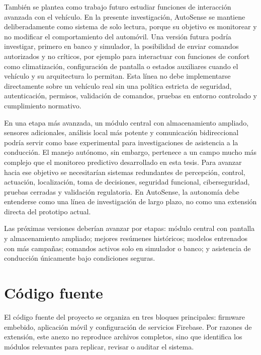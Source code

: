 \documentclass[12pt,letterpaper]{report}
\begin{document}
También se plantea como trabajo futuro estudiar funciones de interacción avanzada con el vehículo. En la presente investigación, AutoSense se mantiene deliberadamente como sistema de solo lectura, porque su objetivo es monitorear y no modificar el comportamiento del automóvil. Una versión futura podría investigar, primero en banco y simulador, la posibilidad de enviar comandos autorizados y no críticos, por ejemplo para interactuar con funciones de confort como climatización, configuración de pantalla o estados auxiliares cuando el vehículo y su arquitectura lo permitan. Esta línea no debe implementarse directamente sobre un vehículo real sin una política estricta de seguridad, autenticación, permisos, validación de comandos, pruebas en entorno controlado y cumplimiento normativo.

En una etapa más avanzada, un módulo central con almacenamiento ampliado, sensores adicionales, análisis local más potente y comunicación bidireccional podría servir como base experimental para investigaciones de asistencia a la conducción. El manejo autónomo, sin embargo, pertenece a un campo mucho más complejo que el monitoreo predictivo desarrollado en esta tesis. Para avanzar hacia ese objetivo se necesitarían sistemas redundantes de percepción, control, actuación, localización, toma de decisiones, seguridad funcional, ciberseguridad, pruebas cerradas y validación regulatoria. En AutoSense, la autonomía debe entenderse como una línea de investigación de largo plazo, no como una extensión directa del prototipo actual.

Las próximas versiones deberían avanzar por etapas: módulo central con pantalla y almacenamiento ampliado; mejores resúmenes históricos; modelos entrenados con más campañas; comandos activos solo en simulador o banco; y asistencia de conducción únicamente bajo condiciones seguras.

\begingroup
\sloppy
\printbibliography[heading=bibintoc,title={Referencias bibliográficas}]
\endgroup

\appendix

\chapter{Código fuente}

El código fuente del proyecto se organiza en tres bloques principales: firmware embebido, aplicación móvil y configuración de servicios Firebase. Por razones de extensión, este anexo no reproduce archivos completos, sino que identifica los módulos relevantes para replicar, revisar o auditar el sistema.
\end{document}
